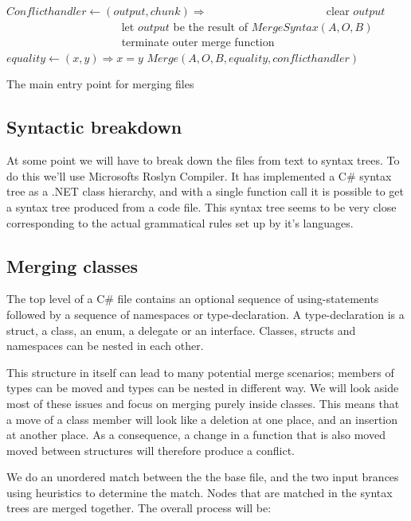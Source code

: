 \documentclass[11pt]{article}
\begin{document}
\begin{algorithm}
\begin{algorithmic}
   \State $Conflicthandler \gets (output, chunk) \Rightarrow$
      \State ~~~~~~~~~~~~~~~~~~~~ clear $output$
      \State ~~~~~~~~~~~~~~~~~~~~ let $output$ be the result of $MergeSyntax(A, O, B)$
      \State ~~~~~~~~~~~~~~~~~~~~ terminate outer merge function
	\State $equality \gets (x, y) \Rightarrow x = y$
	\State \Return $Merge(A, O, B, equality, conflicthandler)$
\EndFunction
\end{algorithmic}
\caption{The main entry point for merging files}
  \label{Mainmerge}
\end{algorithm}

\subsection{Syntactic breakdown}
At some point we will have to break down the files from text to syntax trees. To do this we'll use Microsofts Roslyn Compiler. It has implemented a C\# syntax tree as a .NET class hierarchy, and with a single function call it is possible to get a syntax tree produced from a code file. This syntax tree seems to be very close corresponding to the actual grammatical rules set up by it's languages.



\subsection{Merging classes}
\label{mergingclasses}
The top level of a C\# file contains an optional sequence of using-statements followed by a sequence of namespaces or type-declaration. A type-declaration is a struct, a class, an enum, a delegate or an interface. Classes, structs and namespaces can be nested in each other.

This structure in itself can lead to many potential merge scenarios; members of types can be moved and types can be nested in different way. We will look aside most of these issues and focus on merging purely inside classes. This means that a move of a class member will look like a deletion at one place, and an insertion at another place. As a consequence, a change in a function that is also moved moved between structures will therefore produce a conflict.

We do an unordered match between the the base file, and the two input brances using heuristics to determine the match. Nodes that are matched in the syntax trees are merged together. The overall process will be:
\end{document}
